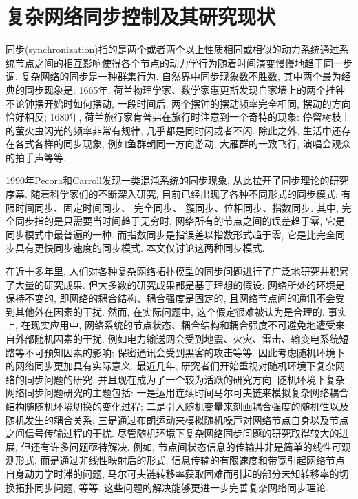 \section{复杂网络同步控制及其研究现状}
同步(synchronization)指的是两个或者两个以上性质相同或相似的动力系统通过系统节点之间的相互影响使得各个节点的动力学行为随着时间演变慢慢地趋于同一步调. 复杂网络的同步是一种群集行为. 自然界中同步现象数不胜数, 其中两个最为经典的同步现象是: 1665年, 荷兰物理学家、数学家惠更斯发现自家墙上的两个挂钟不论钟摆开始时如何摆动, 一段时间后, 两个摆钟的摆动频率完全相同, 摆动的方向恰好相反; 1680年, 荷兰旅行家肯普弗在旅行时注意到一个奇特的现象: 停留树枝上的萤火虫闪光的频率非常有规律, 几乎都是同时闪或者不闪. 除此之外, 生活中还存在各式各样的同步现象, 例如鱼群朝同一方向游动, 大雁群的一致飞行, 演唱会观众的拍手声等等.

1990年Pecora和Carroll发现一类混沌系统的同步现象, 从此拉开了同步理论的研究序幕. 随着科学家们的不断深入研究, 目前已经出现了各种不同形式的同步模式:
有限时间同步、固定时间同步、 完全同步、 簇同步、位相同步、指数同步. 其中, 完全同步指的是只需要当时间趋于无穷时, 网络所有的节点之间的误差趋于零, 它是同步模式中最普遍的一种. 而指数同步是指误差以指数形式趋于零, 它是比完全同步具有更快同步速度的同步模式. 本文仅讨论这两种同步模式.

在近十多年里, 人们对各种复杂网络拓扑模型的同步问题进行了广泛地研究并积累了大量的研究成果. %
但大多数的研究成果都是基于理想的假设: 网络所处的环境是保持不变的, 即网络的耦合结构、耦合强度是固定的, 且网络节点间的通讯不会受到其他外在因素的干扰. 然而, 在实际问题中, 这个假定很难被认为是合理的. 事实上, 在现实应用中, 网络系统的节点状态、耦合结构和耦合强度不可避免地遭受来自外部随机因素的干扰.
例如电力输送网会受到地震、火灾、雷击、输变电系统短路等不可预知因素的影响; 保密通讯会受到黑客的攻击等等.
因此考虑随机环境下的网络同步更加具有实际意义.
最近几年, 研究者们开始重视对随机环境下复杂网络的同步问题的研究, 并且现在成为了一个较为活跃的研究方向. 随机环境下复杂网络同步问题研究的主题包括: 一是运用连续时间马尔可夫链来模拟复杂网络耦合结构随随机环境切换的变化过程; 二是引入随机变量来刻画耦合强度的随机性以及随机发生的耦合关系; 三是通过布朗运动来模拟随机噪声对网络节点自身以及节点之间信号传输过程的干扰. 尽管随机环境下复杂网络同步问题的研究取得较大的进展, 但还有许多问题亟待解决.
例如, 节点间状态信息的传输并非是简单的线性可观测形式, 而是通过非线性映射后的形式; 信息传输的有限速度和带宽引起网络节点自身动力学时滞的问题, 马尔可夫链转移率获取困难而引起的部分未知转移率的切换拓扑同步问题, 等等. 这些问题的解决能够更进一步完善复杂网络同步理论.

